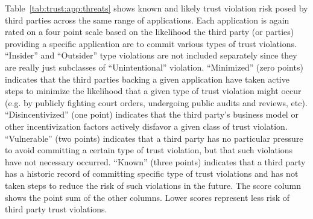 Table~\ref{tab:trust:app:threats} shows known and likely trust
violation risk posed by third parties across the same range of
applications. Each application is again rated on a four point scale
based on the likelihood the third party (or parties) providing a
specific application are to commit various types of trust
violations. ``Insider'' and ``Outsider'' type violations are not
included separately since they are really just subclasses of
``Unintentional'' violation. ``Minimized'' (zero points) indicates
that the third parties backing a given application have taken active
steps to minimize the likelihood that a given type of trust violation
might occur (e.g. by publicly fighting court orders, undergoing public
audits and reviews, etc). ``Disincentivized'' (one point) indicates
that the third party's business model or other incentivization factors
actively disfavor a given class of trust violation. ``Vulnerable''
(two points) indicates that a third party has no particular pressure
to avoid committing a certain type of trust violation, but that such
violations have not necessary occurred. ``Known'' (three points)
indicates that a third party has a historic record of committing
specific type of trust violations and has not taken steps to reduce
the risk of such violations in the future. The score column shows the
point sum of the other columns. Lower scores represent less risk of
third party trust violations.

